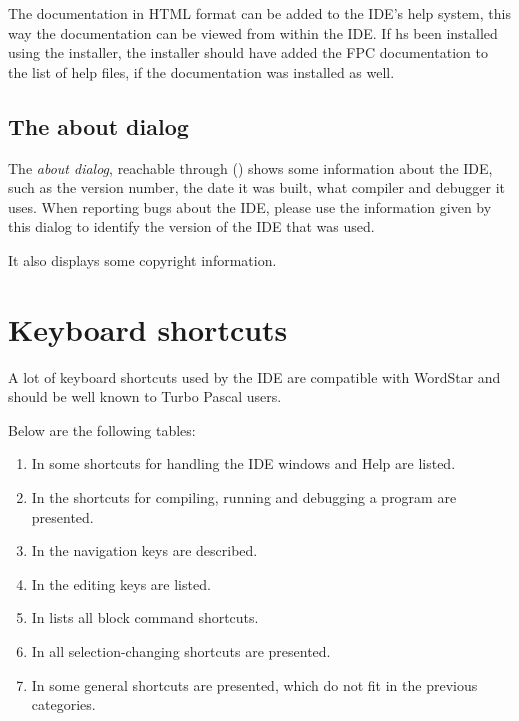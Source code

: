 The \fpc documentation in HTML format can be added to the IDE's help system,
this way the documentation can be viewed from within the IDE. If \fpc hs
been installed using the installer, the installer should have added the 
FPC documentation to the list of help files, if the documentation was
installed as well.

%
%
\subsection{The about dialog}
\label{se:about}
The {\em about dialog}, reachable through () shows some 
information about the IDE, such as the version number, the date it was built,
what compiler and debugger it uses. When reporting bugs about the IDE, please 
use the information given by this dialog to identify the version of the IDE
that was used.

It also displays some copyright information.

\section{Keyboard shortcuts}
\label{se:keyshortcuts}
A lot of keyboard shortcuts used by the IDE are compatible with 
WordStar and should be well known to Turbo Pascal users.

Below are the following tables:
\begin{enumerate}
\item In  some shortcuts for handling the IDE windows
and Help are listed.
\item In  the shortcuts for compiling, running and
debugging a program are presented.
\item In  the navigation keys are described.
\item In  the editing keys are listed.
\item In  lists all block command shortcuts.
\item In  all selection-changing shortcuts are 
presented.
\item In  some general shortcuts are presented, 
which do not fit in the previous categories.
\end{enumerate}

